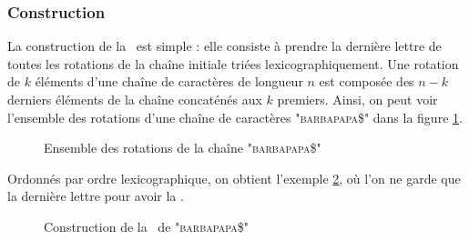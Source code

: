 \subsubsection{Construction}
La construction de la \bwt\ est simple : elle consiste à prendre la dernière lettre de toutes les rotations de la chaîne initiale triées lexicographiquement.
Une rotation de $k$ éléments d'une chaîne de caractères de longueur $n$ est composée des $n-k$ derniers éléments de la chaîne concaténés aux $k$ premiers.
Ainsi, on peut voir l'ensemble des rotations d'une chaîne de caractères "\textsc{barbapapa\$}" dans la figure \ref{rotations}.

\begin{figure}[h!]
\caption{Ensemble des rotations de la chaîne "\textsc{barbapapa\$}"}
\label{rotations}
\end{figure}

Ordonnés par ordre lexicographique, on obtient l'exemple \ref{bwt}, où l'on ne garde que la dernière lettre pour avoir la \bwt.
\begin{figure}[h!]
\caption{Construction de la \bwt\ de "\textsc{barbapapa\$}"}
\label{bwt}
\end{figure}

